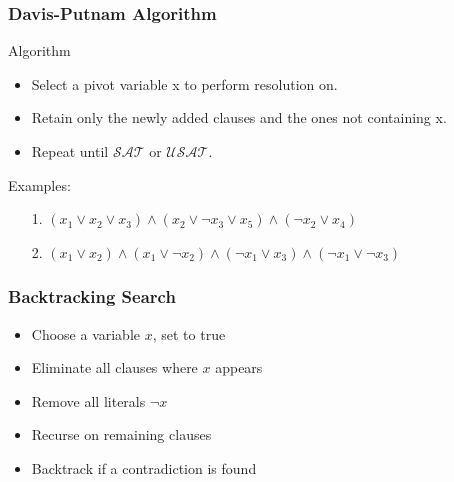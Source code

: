 \documentclass{beamer}
\def\msat{{\mathcal{SAT}}}
\def\musat{{\mathcal{USAT}}}
\begin{document}
\begin{frame}
\frametitle{Davis-Putnam Algorithm}
Algorithm
\begin{itemize}
\item Select a pivot variable x to perform resolution on.
\item Retain only the newly added clauses and the ones not containing x.
\item Repeat until $\pmb\msat$ or $\pmb\musat$.
\end{itemize}
Examples:
\begin{enumerate}[\quad1.]
\item[1.] $(x_1 \vee x_2 \vee x_3 ) \wedge (x_2 \vee \neg x_3 \vee x_5 ) \wedge (\neg x_2 \vee x_4 )$
\item[2.] $(x_1 \vee x_2 ) \wedge (x_1 \vee \neg x_2 ) \wedge (\neg x_1 \vee x_3 ) \wedge (\neg x_1 \vee \neg x_3 )$
\end{enumerate}
\end{frame}


\begin{frame}
\frametitle{Backtracking Search}
\begin{itemize}
\item Choose a variable $x$, set to true
\item Eliminate all clauses where $x$ appears
\item Remove all literals $\neg x$
\item Recurse on remaining clauses
\item Backtrack if a contradiction is found
\end{itemize}
\end{frame}
\end{document}

